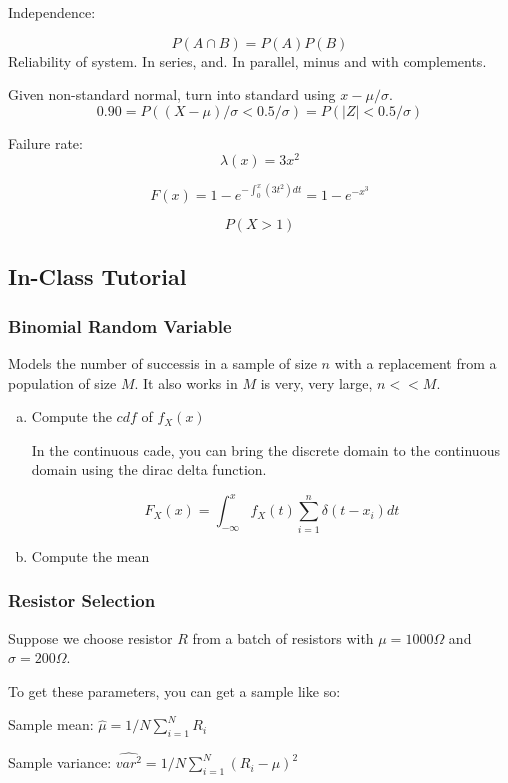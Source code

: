 \documentclass{report}
\begin{document}
Independence:

$$P(A \cap B) = P(A)P(B)$$
Reliability of system. In series, and. In parallel, minus and with complements.


Given non-standard normal, turn into standard using $x-\mu/\sigma$.
$$0.90 = P((X - \mu)/\sigma < 0.5/\sigma ) = P(|Z| < 0.5/\sigma) $$

Failure rate: $$\lambda(x) = 3x^2$$

$$F(x) = 1-e^{-\int_0^x( 3t^2 )dt} = 1-e^{-x^3} $$

$$P(X > 1)$$


\subsection{In-Class Tutorial}

\subsubsection{Binomial Random Variable}

Models the number of successis in a sample of size $n$ with a replacement from a population of size $M$. It also works in $M$ is very, very large, $n << M$.

\begin{enumerate}[(a)]

\item Compute the $cdf$ of $f_X(x)$

In the continuous cade, you can bring the discrete domain to the continuous domain using the dirac delta function. 

$$F_X(x) = \int_{-\infty}^{x} f_X(t) \sum_{i=1}^n \delta(t-x_i) dt$$

\item Compute the mean

\end{enumerate}

\subsubsection{Resistor Selection}

Suppose we choose resistor $R$ from a batch of resistors with $\mu = 1000 \Omega$ and $\sigma = 200 \Omega$.

To get these parameters, you can get a sample like so:

Sample mean: $\hat{\mu} = 1/N \sum_{i=1}^N R_i $

Sample variance: $\hat{var^2} = 1/N \sum_{i=1}^N (R_i - \mu)^2 $
\end{document}
